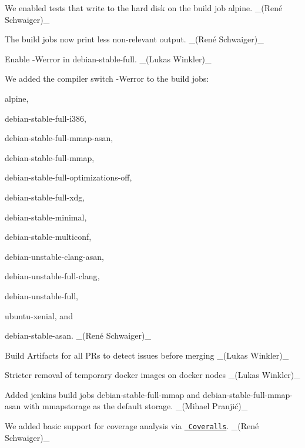 \begin{DoxyItemize}
\item We enabled tests that write to the hard disk on the build job {\ttfamily alpine}. \+\_\+(René Schwaiger)\+\_\+
\item The build jobs now print less non-\/relevant output. \+\_\+(René Schwaiger)\+\_\+
\item Enable {\ttfamily -\/Werror} in {\ttfamily debian-\/stable-\/full}. \+\_\+(\+Lukas Winkler)\+\_\+
\item We added the compiler switch {\ttfamily -\/Werror} to the build jobs\+:
\begin{DoxyItemize}
\item {\ttfamily alpine},
\item {\ttfamily debian-\/stable-\/full-\/i386},
\item {\ttfamily debian-\/stable-\/full-\/mmap-\/asan},
\item {\ttfamily debian-\/stable-\/full-\/mmap},
\item {\ttfamily debian-\/stable-\/full-\/optimizations-\/off},
\item {\ttfamily debian-\/stable-\/full-\/xdg},
\item {\ttfamily debian-\/stable-\/minimal},
\item {\ttfamily debian-\/stable-\/multiconf},
\item {\ttfamily debian-\/unstable-\/clang-\/asan},
\item {\ttfamily debian-\/unstable-\/full-\/clang},
\item {\ttfamily debian-\/unstable-\/full},
\item {\ttfamily ubuntu-\/xenial}, and
\item {\ttfamily debian-\/stable-\/asan}. \+\_\+(René Schwaiger)\+\_\+
\end{DoxyItemize}
\item Build Artifacts for all PR\textquotesingle{}s to detect issues before merging \+\_\+(\+Lukas Winkler)\+\_\+
\item Stricter removal of temporary docker images on docker nodes \+\_\+(\+Lukas Winkler)\+\_\+
\item Added jenkins build jobs {\ttfamily debian-\/stable-\/full-\/mmap} and {\ttfamily debian-\/stable-\/full-\/mmap-\/asan} with {\ttfamily mmapstorage} as the default storage. \+\_\+(Mihael Pranjić)\+\_\+
\item We added basic support for coverage analysis via \href{http://coveralls.io}{\texttt{ Coveralls}}. \+\_\+(René Schwaiger)\+\_\+
\end{DoxyItemize}


